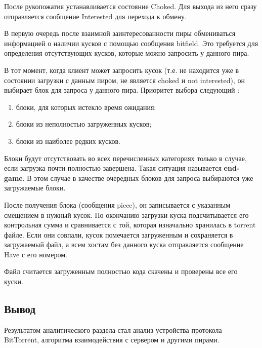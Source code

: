 После рукопожатия устанавливается состояние Choked. Для выхода из него сразу отправляется сообщение Interested для перехода к обмену.

В первую очередь после взаимной заинтересованности пиры обмениваться информацией о наличии кусков с помощью сообщения bitfield. Это требуется для определения отсутствующих кусков, которые можно запросить у данного пира. 

В тот момент, когда клиент может запросить кусок (т.е. не находится уже в состоянии загрузки с данным пиром, не является choked и not interested), он выбирает блок для запроса у данного пира. Приоритет выбора следующий \cite{survey}:
\begin{enumerate}
	\item блоки, для которых истекло время ожидания;
	
	\item блоки из неполностью загруженных кусков;
	
	\item блоки из наиболее редких кусков. \\
\end{enumerate}

Блоки будут отсутствовать во всех перечисленных категориях только в случае, если загрузка почти полностью завершена. Такая ситуация называется \textbf{end-game}. В этом случае в качестве очередных блоков для запроса выбираются уже загружаемые блоки.

После получения блока (сообщения piece), он записывается с указанным смещением в нужный кусок. По окончанию загрузки куска подсчитывается его контрольная сумма и сравнивается с той, которая изначально хранилась в torrent файле. Если они совпали, кусок помечается загруженным и сохраняется в загружаемый файл, а всем хостам без данного куска отправляется сообщение Have с его номером.

Файл считается загруженным полностью кода скачены и проверены все его куски. \newline

\subsection*{Вывод}
Результатом аналитического раздела стал анализ устройства протокола BitTorrent, алгоритма взаимодействия с сервером и другими пирами.